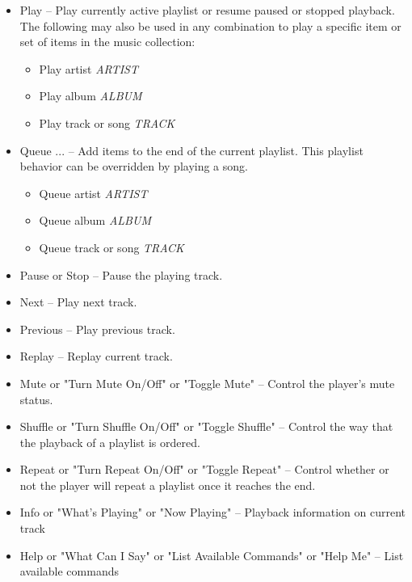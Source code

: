 \documentclass[12pt,letterpaper]{article}
\begin{document}
\begin{itemize}
\item Play -- Play currently active playlist or resume paused or stopped playback. \\ The following may also be used in any combination to play a specific item or set of items in the music collection:
	\begin{itemize}
	\item Play artist \textit{ARTIST}
	\item Play album \textit{ALBUM}
	\item Play track or song \textit{TRACK}
	\end{itemize}
\item {\color{red}Queue ... -- Add items to the end of the current playlist. This playlist behavior can be overridden by playing a song.
	\begin{itemize}
	\item Queue artist \textit{ARTIST}
	\item Queue album \textit{ALBUM}
	\item Queue track or song \textit{TRACK}
	\end{itemize}}
\item Pause or Stop -- Pause the playing track.
\item Next -- Play next track.
\item Previous -- Play previous track.
\item Replay -- Replay current track.
\item Mute or "Turn Mute On/Off" or "Toggle Mute" -- Control the player's mute status.
\item Shuffle or "Turn Shuffle On/Off" or "Toggle Shuffle" -- Control the way that the playback of a playlist is ordered.
\item Repeat or "Turn Repeat On/Off" or "Toggle Repeat" -- Control whether or not the player will repeat a playlist once it reaches the end.
\item {\color{red} Info or "What's Playing" or "Now Playing" -- Playback information on current track}
\item {\color{red} Help or "What Can I Say" or "List Available Commands" or "Help Me" -- List available commands}


\end{itemize}
\end{document}
